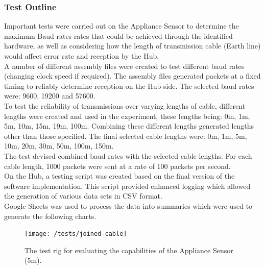 \documentclass[draft,preprint,12pt,3p]{elsarticle}
\begin{document}
\subsubsection{Test Outline}
Important tests were carried out on the Appliance Sensor to determine the maximum Baud rates rates that could be achieved through the identified hardware, as well as considering how the length of transmission cable (Earth line) would affect error rate and reception by the Hub.\\
A number of different assembly files were created to test different baud rates (changing clock speed if required). The assembly files generated packets at a fixed timing to reliably determine reception on the Hub-side. The selected baud rates were: 9600, 19200 and 57600.\\
To test the reliability of transmissions over varying lengths of cable, different lengths were created and used in the experiment, these lengths being: 0m, 1m, 5m, 10m, 15m, 19m, 100m. Combining these different lengths generated lengths other than those specified. The final selected cable lengths were: 0m, 1m, 5m, 10m, 20m, 30m, 50m, 100m, 150m.\\
The test devised combined baud rates with the selected cable lengths. For each cable length, 1000 packets were sent at a rate of 100 packets per second.\\
On the Hub, a testing script was created based on the final version of the software implementation. This script provided enhanced logging which allowed the generation of various data sets in CSV format.\\
Google Sheets was used to process the data into summaries which were used to generate the following charts.

\begin{figure}[H]
\centering
\texttt{[image: /tests/joined-cable]}
\caption{The test rig for evaluating the capabilities of the Appliance Sensor (5m).}
\label{fig:joined-cable}
\end{figure}
\end{document}
